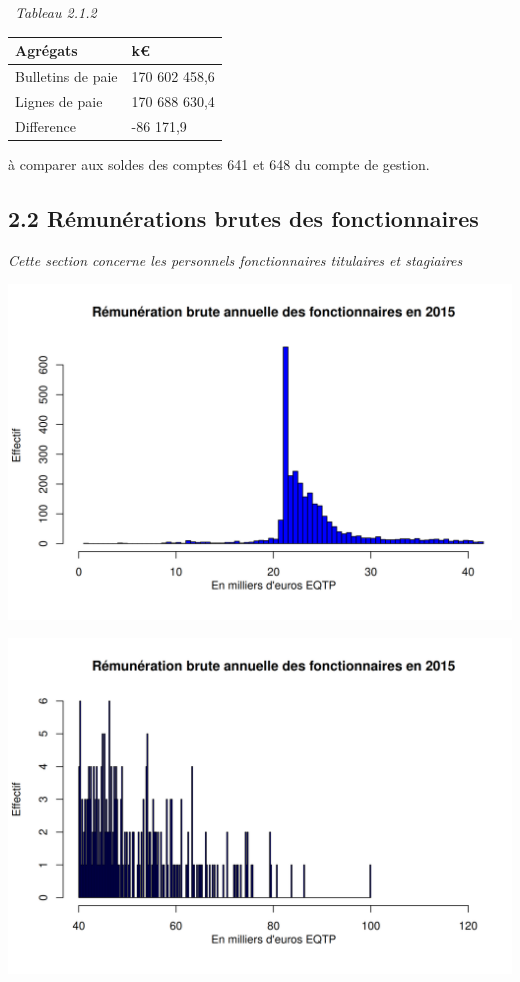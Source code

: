 ~\emph{Tableau 2.1.2}

\begin{longtable}[]{@{}ll@{}}
\toprule
Agrégats & k€\tabularnewline
\midrule
\endhead
Bulletins de paie & 170 602 458,6\tabularnewline
Lignes de paie & 170 688 630,4\tabularnewline
Difference & -86 171,9\tabularnewline
\bottomrule
\end{longtable}

à comparer aux soldes des comptes 641 et 648 du compte de gestion.

\hypertarget{remunerations-brutes-des-fonctionnaires}{%
\subsection{2.2 Rémunérations brutes des
fonctionnaires}\label{remunerations-brutes-des-fonctionnaires}}

\emph{Cette section concerne les personnels fonctionnaires titulaires et
stagiaires}

\includegraphics{altair_files/figure-latex/unnamed-chunk-43-1.png}

\includegraphics{altair_files/figure-latex/unnamed-chunk-43-2.png}

